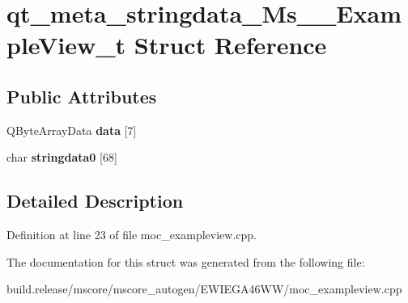 \hypertarget{structqt__meta__stringdata___ms_____example_view__t}{}\section{qt\+\_\+meta\+\_\+stringdata\+\_\+\+Ms\+\_\+\+\_\+\+Example\+View\+\_\+t Struct Reference}
\label{structqt__meta__stringdata___ms_____example_view__t}
\subsection*{Public Attributes}
\begin{DoxyCompactItemize}
\item 
\mbox{\label{structqt__meta__stringdata___ms_____example_view__t_a7d1ca3bb052479a94e4023a79844964d}} 
Q\+Byte\+Array\+Data {\bfseries data} \mbox{[}7\mbox{]}
\item 
\mbox{\label{structqt__meta__stringdata___ms_____example_view__t_afcc60e90efe23c932fad65b9d492fecf}} 
char {\bfseries stringdata0} \mbox{[}68\mbox{]}
\end{DoxyCompactItemize}


\subsection{Detailed Description}


Definition at line 23 of file moc\+\_\+exampleview.\+cpp.



The documentation for this struct was generated from the following file\+:\begin{DoxyCompactItemize}
\item 
build.\+release/mscore/mscore\+\_\+autogen/\+E\+W\+I\+E\+G\+A46\+W\+W/moc\+\_\+exampleview.\+cpp\end{DoxyCompactItemize}
